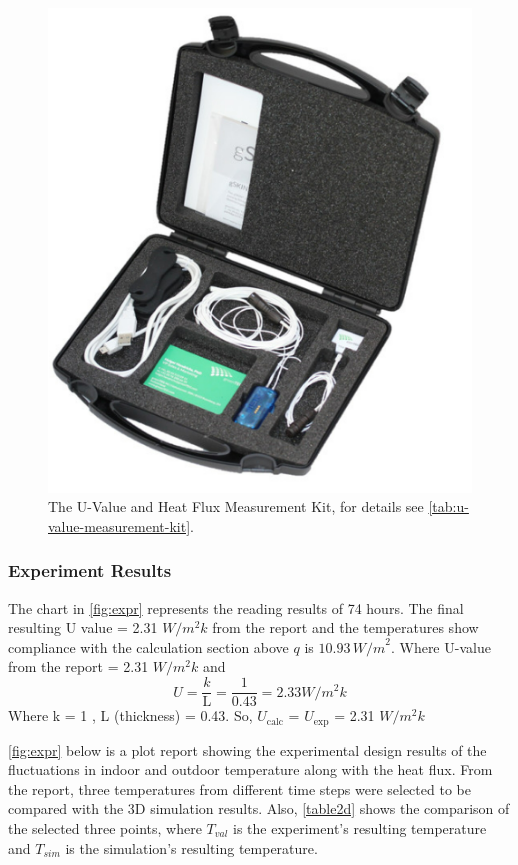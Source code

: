 \begin{figure}[tbh]
     \centering
    \includegraphics[width=0.5\linewidth]{Figures/greenteg.png}
     \caption[U-value measurement Kit]{The U-Value and Heat Flux Measurement Kit, for details see \cref{tab:u-value-measurement-kit}.}
   \label{fig:toolkit}
 \end{figure}






\subsubsection{Experiment Results}
The chart in \ref{fig:expr} represents the reading results of 74 hours. The final resulting U value = 2.31 ${W/m^2k}$ from the report and the temperatures show compliance with the calculation section above \( q \) is \( 10.93 \, {W/m}^2 \). 
Where U-value from the report = 2.31 ${W/m^2k}$ and 
\begin{equation}
    U = \frac{k}{\text{L}}
      = \frac{1}{\text{0.43}} = 2.33  {W/m^2k}
\end{equation}
Where k = 1 , L (thickness) = 0.43. So, \(U_{\text{calc}}\) = \(U_{\text{exp}}\) = 2.31 ${W/m^2k}$ 

\ref{fig:expr} below is a plot report showing the experimental design results of the fluctuations in indoor and outdoor temperature along with the heat flux. From the report, three temperatures from different time steps were selected to be compared with the 3D simulation results. Also, \ref{table2d} shows the comparison of the selected three points, where $T_{val}$ is the experiment's resulting temperature and $T_{sim}$ is the simulation's resulting temperature.

